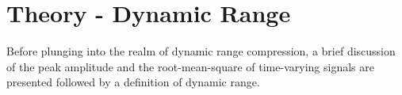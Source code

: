 \documentclass[../main2.tex]{subfiles}
\providecommand{\rootdir}{..}
\begin{document}
\FloatBarrier
\section{Theory - Dynamic Range} \label{theory_dynamic_range}
Before plunging into the realm of dynamic range compression, a brief discussion of the peak amplitude and the root-mean-square of time-varying signals are presented followed by a definition of dynamic range. 


\end{document}
